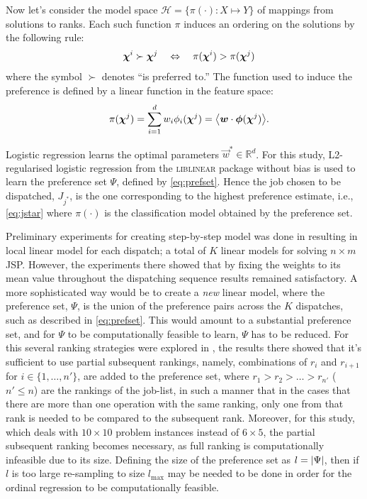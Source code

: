 \documentclass[twocolumn]{svjour3}
\begin{document}
Now let's consider the model space $\mathcal{H} = \{\pi(\cdot) : X \mapsto Y\}$ 
of mappings from solutions to ranks. Each such 
function $\pi$ induces an ordering on the solutions by the following rule:
\begin{equation}\quad\label{eq:linear}
\bm \chi^i \succ \bm \chi^j \quad \Leftrightarrow \quad \pi(\bm \chi^i) > 
\pi(\bm \chi^j)
\end{equation}
where the symbol $\succ$ denotes ``is preferred to.''  The function used to 
induce the preference is defined by a linear function in the feature space:
\begin{equation}\quad 
\pi(\vchi^j)=\sum_{i=1}^d w_i\phi_i(\vchi^j)=\inner{\vec{w}}{\vphi(\vchi^j)}.
\end{equation}

Logistic regression learns the optimal parameters $\vec{w}^*\in\mathbb{R}^d$. 
For this study, L2-regularised logistic regression from the \textsc{liblinear} 
package \cite{liblinear} without bias is used to learn the preference set 
$\Psi$, defined by \cref{eq:prefset}.
Hence the job chosen to be dispatched, $J_{j^*}$, is the one corresponding to 
the highest preference estimate, i.e., \cref{eq:jstar} where $\pi(\cdot)$ is 
the classification model obtained by the preference set.

Preliminary experiments for creating step-by-step model was done in 
\cite{InRu11a} resulting in local linear model for each dispatch; a total of 
$K$ linear models for solving $n\times m$ JSP. 
However, the experiments there showed that by fixing the weights to its mean 
value throughout the dispatching sequence results remained satisfactory.
A more sophisticated way would be to create a \emph{new} linear model, where 
the preference set, $\Psi$, is the union of the preference pairs across the 
$K$ dispatches, such as described in \cref{eq:prefset}. 
This would amount to a substantial preference set, and for $\Psi$ to be 
computationally feasible to learn, $\Psi$ has to be reduced. For this several 
ranking strategies were explored in \cite{InRu15a}, the results there showed 
that it's sufficient to use partial subsequent rankings, namely, combinations 
of $r_i$ and $r_{i+1}$ for $i\in\{1,\ldots,n'\}$, are added to the preference 
set, where $r_1>r_2>\ldots>r_{n'}$ ($n'\leq n$) are the rankings of the 
job-list, in such a manner that in the cases that there are more than one 
operation with the same ranking, only one from that rank is needed to be 
compared to the subsequent rank. 
Moreover, for this study, which deals with $10\times 10$ problem instances 
instead of $6\times5$, 
the partial subsequent ranking becomes necessary, as full ranking is 
computationally infeasible due to its size. 
Defining the size of the preference set as $l=\lvert\Psi\rvert$, then if  $l$ is too 
large re-sampling to size $l_{\max}$ may be needed to be done in order for the 
ordinal regression to be computationally feasible. 
\end{document}
